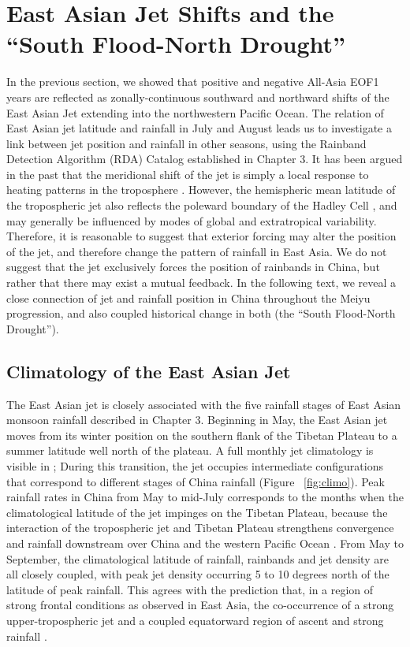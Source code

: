 \section{East Asian Jet Shifts and the ``South Flood-North Drought''}

	In the previous section, we showed that positive and negative All-Asia EOF1 years are reflected as zonally-continuous southward and northward shifts of the East Asian Jet extending into the northwestern Pacific Ocean. The relation of East Asian jet latitude and rainfall in July and August leads us to investigate a link between jet position and rainfall in other seasons, using the Rainband Detection Algorithm (RDA) Catalog established in Chapter 3. It has been argued in the past that the meridional shift of the jet is simply a local response to heating patterns in the troposphere \citep{Yu and Zhou}. However, the hemispheric mean latitude of the tropospheric jet also reflects the poleward boundary of the Hadley Cell \citep{Kang2015}, and may generally be influenced by modes of global and extratropical variability. Therefore, it is reasonable to suggest that exterior forcing may alter the position of the jet, and therefore change the pattern of rainfall in East Asia. We do not suggest that the jet exclusively forces the position of rainbands in China, but rather that there may exist a mutual feedback. In the following text, we reveal a close connection of jet and rainfall position in China throughout the Meiyu progression, and also coupled historical change in both (the ``South Flood-North Drought'').
	
\subsection{Climatology of the East Asian Jet}

	The East Asian jet is closely associated with the five rainfall stages of East Asian monsoon rainfall described in Chapter 3. Beginning in May, the East Asian jet moves from its winter position on the southern flank of the Tibetan Plateau to a summer latitude well north of the plateau.  A full monthly jet climatology is visible in \citet{Schiemann2009}; During this transition, the jet occupies intermediate configurations that correspond to different stages of China rainfall (Figure ~\ref{fig:climo}). Peak rainfall rates in China from May to mid-July corresponds to the months when the climatological latitude of the jet impinges on the Tibetan Plateau, because the interaction of the tropospheric jet and Tibetan Plateau strengthens convergence and rainfall downstream over China and the western Pacific Ocean \citep{Molnar2010,Sampe2010,Chen2014}. From May to September,  the climatological latitude of rainfall, rainbands and jet density are all closely coupled, with peak jet density occurring 5 to 10 degrees north of the latitude of peak rainfall. This agrees with the prediction that, in a region of strong frontal conditions as observed in East Asia, the co-occurrence of a strong upper-tropospheric jet and a coupled equatorward region of ascent and strong rainfall \citep{Holton2004}. 
	
